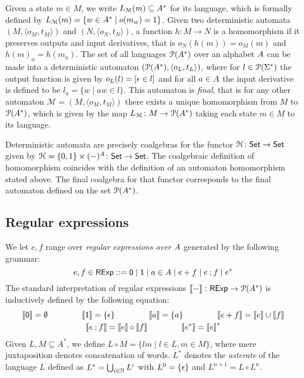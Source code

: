 Given a state $m \in M$, we write $L_{\mathcal{M}} (m) \subseteq {{A}^{\ast}}$ for its language, which is formally defined by $L_{\mathcal{M}}(m) = \{w \in {A}^\ast \mid o(m_w) = 1\}$. 
Given two deterministic automata $(M, \langle o_M, t_M \rangle)$ and $(N, \langle o_N, t_N \rangle)$, a function $h \colon M \to N$ is a homomorphism if it preserves outputs and input derivatives, that is $o_N(h(m))=o_M(m)$ and $h(m)_a = h(m_a)$. The set of all languages $\mathcal{P}({A}^{\ast})$ over an alphabet ${A}$ can be made into a deterministic automaton $(\mathcal{P}({A}^\ast), \langle o_L, t_L\rangle)$, where for $l \in \mathcal{P} (\Sigma^{\ast})$ the output function is given by $o_L(l)=[\epsilon \in l]$ and for all $a \in {A}$ the input derivative is defined to be $l_a = \{w \mid aw \in l\}$. This automaton is \emph{final}, that is for any other automaton $\mathcal{M} = (M, \langle o_M, t_M \rangle)$ there exists a unique homomorphism from $M$ to $\mathcal{P}({A}^{\ast})$, which is given by the map $L_{\mathcal{M}} \colon M \to \mathcal{P}({A}^\ast)$ taking each state $m \in M$ to its language.
\begin{fact}
	Deterministic automata are precisely coalgebras for the functor $\mathcal{H} \colon {\mathsf{Set}} \to {\mathsf{Set}}$ given by $\mathcal{H} = \{0,1\} \times (-)^{A} \colon {\mathsf{Set}} \to {\mathsf{Set}}$. The coalgebraic definition of homomorphism coincides with the definition of an automaton homomorphism stated above. The final coalgebra for that functor corresponds to the final automaton defined on the set $\mathcal{P}({A}^\ast)$.
\end{fact}
\subsection{Regular expressions}\label{c2:subsec:regular_expressions}
We let $e, f$ range over \emph{regular expressions over ${A}$} generated by the following grammar:
$$e , f \in \mathsf{RExp} ::= \mathsf{0} \mid \mathsf{1} \mid a \in {A} \mid e + f \mid e \mathbin{;} f \mid e^{\ast}$$
The standard interpretation of regular expressions $\left\llbracket{-}\right\rrbracket \colon \mathsf{RExp} \to \mathcal{P}({A}^\ast)$ is inductively defined by the following equation:
\begin{gather*}
	\left\llbracket{\mathsf{0}}\right\rrbracket = \emptyset \qquad\qquad \left\llbracket{\mathsf{1}}\right\rrbracket = \{\epsilon\} \qquad\qquad \left\llbracket{a}\right\rrbracket = \{ a \} \qquad\qquad \left\llbracket{e + f}\right\rrbracket =  \left\llbracket{e}\right\rrbracket  \cup \left\llbracket{f}\right\rrbracket \\ \left\llbracket{e \mathbin{;}f}\right\rrbracket  = \left\llbracket{e}\right\rrbracket  \circ \left\llbracket{f}\right\rrbracket \qquad\qquad \left\llbracket{e^\ast}\right\rrbracket = \left\llbracket{e}\right\rrbracket^\ast
\end{gather*}
Given $L, M \subseteq A^\ast$, we define $L \circ M = \{lm \mid l \in L, m \in M\}$, where mere juxtaposition denotes concatenation of words. $L^\ast$ denotes the \emph{asterate} of the language $L$ defined as $L^\ast = \bigcup_{i \in \mathbb{N}} L^i$ with $L^0 = \{\epsilon\}$ and $L^{n + 1} = L \circ L^{n}$.
